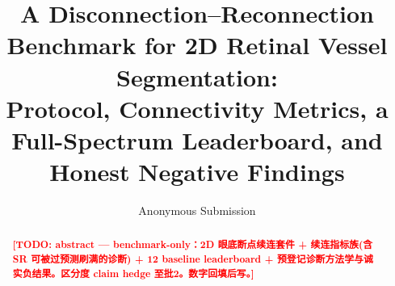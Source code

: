 \documentclass[11pt]{article}
\title{A Disconnection--Reconnection Benchmark for 2D Retinal Vessel Segmentation:\\
Protocol, Connectivity Metrics, a Full-Spectrum Leaderboard, and Honest Negative Findings}
\author{Anonymous Submission}
\date{}
\newcommand{\TODO}[1]{\textcolor{red}{\textbf{[TODO: #1]}}}
\begin{document}
\maketitle

\begin{abstract}
\TODO{abstract — benchmark-only：2D 眼底断点续连套件 + 续连指标族(含 SR 可被过预测刷满的诊断) + 12 baseline leaderboard + 预登记诊断方法学与诚实负结果。区分度 claim hedge 至批2。数字回填后写。}
\end{abstract}






\end{document}
